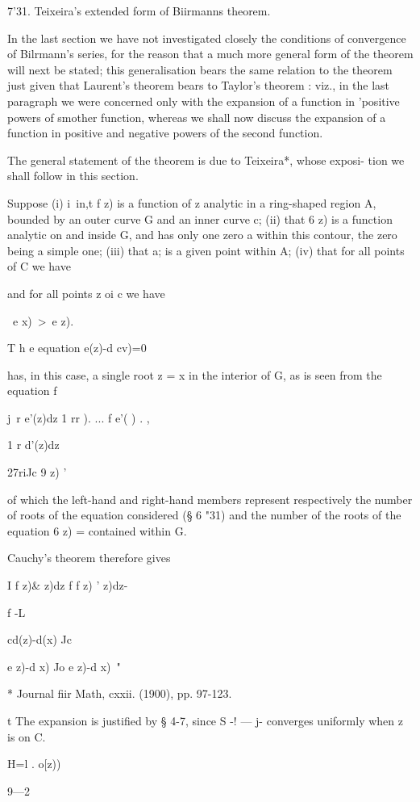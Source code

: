 7'31. Teixeira's extended form of Biirmanns theorem.

In the last section we have not investigated closely the conditions of
convergence of Bilrmann's series, for the reason that a much more
general form of the theorem will next be stated; this generalisation
bears the same relation to the theorem just given that Laurent's
theorem bears to Taylor's theorem : viz., in the last paragraph we
were concerned only with the expansion of a function in 'positive
powers of smother function, whereas we shall now discuss the expansion
of a function in positive and negative powers of the second function.

The general statement of the theorem is due to Teixeira*, whose
exposi- tion we shall follow in this section.

Suppose (i) i\ in,t f z) is a function of z analytic in a ring-shaped
region A, bounded by an outer curve G and an inner curve c; (ii) that
6 z) is a function analytic on and inside G, and has only one zero a
within this contour, the zero being a simple one; (iii) that a; is a
given point within A; (iv) that for all points of C we have

and for all points z oi c we have

\ e x)\ >\ e z).

T h e equation e(z)-d cv)=0

has, in this case, a single root z = x in the interior of G, as is
seen from the equation f

j\ r e'(z)dz 1 rr ). ... f e'( ) . ,

1 r d'(z)dz

27riJc 9 z) '

of which the left-hand and right-hand members represent respectively
the number of roots of the equation considered (§ 6 "31) and the
number of the roots of the equation 6 z) = contained within G.

Cauchy's theorem therefore gives

I f z)\& z)dz f f z) ' z)dz-

f -L

 cd(z)-d(x) Jc

e z)-d x) Jo e z)-d x)\ "

* Journal fiir Math, cxxii. (1900), pp. 97-123.

t The expansion is justified by § 4-7, since S -! — j- converges
uniformly when z is on C.

H=l . o[z))

9—2

